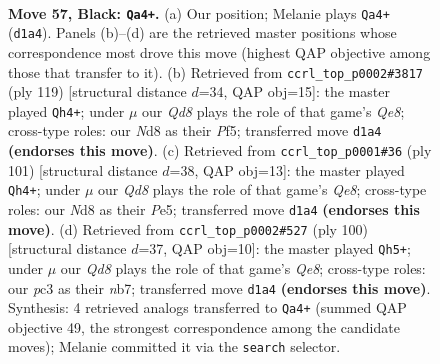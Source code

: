 \documentclass[11pt]{article}
\begin{document}
\clearpage

\begin{figure}[p]\centering
\begin{subfigure}{0.46\textwidth}\centering
\resizebox{\linewidth}{!}{%
\newchessgame
\chessboard[
  setfen={2kn2Q1/p1p3p1/1p4p1/2p5/8/2P5/KP6/3q4 b - - 15 57},
  showmover=false,
  pgfstyle=straightmove, color=movearrow, markmove={d1-a4}
]}
\caption{}
\end{subfigure}\hfill
\begin{subfigure}{0.46\textwidth}\centering
\resizebox{\linewidth}{!}{%
\newchessgame
\chessboard[
  setfen={8/3P2pk/4p2p/4Pp2/1p3P2/8/2Q3PK/4q3 b - - 0 60},
  showmover=false,
  pgfstyle=straightmove, color=movearrow, markmove={e1-h4}
]}
\caption{}
\end{subfigure}
\\[4pt]
\begin{subfigure}{0.46\textwidth}\centering
\resizebox{\linewidth}{!}{%
\newchessgame
\chessboard[
  setfen={8/6pk/7p/2Q1pp2/1P6/5P2/6PK/4q3 b - - 7 51},
  showmover=false,
  pgfstyle=straightmove, color=movearrow, markmove={e1-h4}
]}
\caption{}
\end{subfigure}\hfill
\begin{subfigure}{0.46\textwidth}\centering
\resizebox{\linewidth}{!}{%
\newchessgame
\chessboard[
  setfen={4Q3/1n4pk/1p3q2/3PN3/2P2P1P/8/3p3P/6K1 w - - 6 51},
  showmover=false,
  pgfstyle=straightmove, color=movearrow, markmove={e8-h5}
]}
\caption{}
\end{subfigure}
\caption{\textbf{Move 57, Black: \texttt{Qa4+}.} (a) Our position; Melanie plays \texttt{Qa4+} (\texttt{d1a4}). Panels (b)--(d) are the retrieved master positions whose correspondence most drove this move (highest QAP objective among those that transfer to it). (b) Retrieved from \texttt{ccrl\_top\_p0002\#3817} (ply 119) [structural distance $d$=34, QAP obj=15]: the master played \texttt{Qh4+}; under $\mu$ our \emph{Qd8} plays the role of that game's \emph{Qe8}; cross-type roles: our \emph{N}d8 as their \emph{P}f5; transferred move \texttt{d1a4} \textbf{(endorses this move)}. (c) Retrieved from \texttt{ccrl\_top\_p0001\#36} (ply 101) [structural distance $d$=38, QAP obj=13]: the master played \texttt{Qh4+}; under $\mu$ our \emph{Qd8} plays the role of that game's \emph{Qe8}; cross-type roles: our \emph{N}d8 as their \emph{P}e5; transferred move \texttt{d1a4} \textbf{(endorses this move)}. (d) Retrieved from \texttt{ccrl\_top\_p0002\#527} (ply 100) [structural distance $d$=37, QAP obj=10]: the master played \texttt{Qh5+}; under $\mu$ our \emph{Qd8} plays the role of that game's \emph{Qe8}; cross-type roles: our \emph{p}c3 as their \emph{n}b7; transferred move \texttt{d1a4} \textbf{(endorses this move)}. Synthesis: 4 retrieved analogs transferred to \texttt{Qa4+} (summed QAP objective 49, the strongest correspondence among the candidate moves); Melanie committed it via the \texttt{search} selector.}
\label{fig:thought-m113}
\end{figure}
\end{document}
